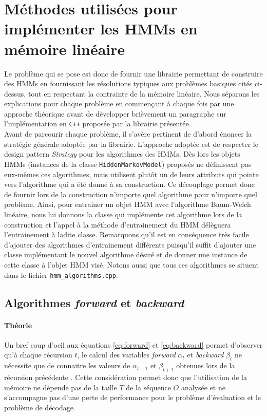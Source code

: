 \documentclass[letterpaper]{article}
\begin{document}
\section{Méthodes utilisées pour implémenter les HMMs en mémoire linéaire}
Le problème qui se pose est donc de fournir une librairie permettant de construire des HMMs en fournissant les résolutions typiques aux problèmes basiques cités ci-dessus, tout en respectant la contrainte de la mémoire linéaire. Nous séparons les explications pour chaque problème en commençant à chaque fois par une approche théorique avant de développer brièvement un paragraphe sur l'implémentation en \texttt{C++} proposée par la librairie présentée. \\

Avant de parcourir chaque problème, il s'avère pertinent de d'abord énoncer la stratégie générale adoptée par la librairie. L'approche adoptée est de respecter le design pattern \textit{Strategy} pour les algorithmes des HMMs. Dès lors les objets HMMs (instances de la classe \texttt{HiddenMarkovModel}) proposés ne définissent pas eux-mêmes ces algorithmes, mais utilisent plutôt un de leurs attributs qui pointe vers l'algorithme qui a été donné à sa construction. Ce découplage permet donc de fournir lors de la construction n'importe quel algorithme pour n'importe quel problème. Ainsi, pour entrainer un objet HMM avec l'algorithme Baum-Welch linéaire, nous lui donnons la classe qui implémente cet algorithme lors de la construction et l'appel à la méthode d'entrainement du HMM délèguera l'entrainement à ladite classe. Remarquons qu'il est en conséquence très facile d'ajouter des algorithmes d'entrainement différents puisqu'il suffit d'ajouter une classe implémentant le nouvel algorithme désiré et de donner une instance de cette classe à l'objet HMM visé.  Notons aussi que tous ces algorithmes se situent dans le fichier \texttt{hmm\_algorithms.cpp}. 

\subsection{Algorithmes \textit{forward} et \textit{backward}}
\paragraph{Théorie}
Un bref coup d'oeil aux équations \ref{eq:forward} et \ref{eq:backward}  permet d'observer qu'à chaque récursion $t$, le calcul des variables \textit{forward} $\alpha_t$ et \textit{backward} $\beta_t$ ne nécessite que de connaitre les valeurs de $\alpha_{t-1}$ et $\beta_{t+1}$ obtenues lors de la récursion précédente \citep{MM}. Cette considération permet donc que l'utilisation de la mémoire ne dépende pas de la taille $T$ de la séquence $O$ analysée et ne s'accompagne pas d'une perte de performance pour le problème d'évaluation et le problème de décodage.
\end{document}
